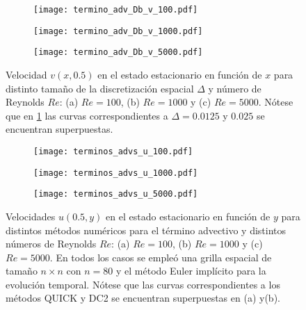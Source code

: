 \documentclass[aps,prb,twocolumn,superscriptaddress,floatfix,longbibliography,10pt]{revtex4-2}
\newcounter{para}
\begin{document}
\begin{figure}
  \centering
  
  \begin{subfigure}[b]{0.32\textwidth}
    \centering
    \texttt{[image: termino\_adv\_Db\_v\_100.pdf]}
    \caption{}
    \label{fig:termino_adv_Db_v_100}
\end{subfigure}
\hfill
\begin{subfigure}[b]{0.32\textwidth}
    \centering
    \texttt{[image: termino\_adv\_Db\_v\_1000.pdf]}
    \caption{}
    \label{fig:termino_adv_Db_v_1000}
\end{subfigure}
\hfill
\begin{subfigure}[b]{0.32\textwidth}
    \centering
    \texttt{[image: termino\_adv\_Db\_v\_5000.pdf]}
    \caption{}
    \label{fig:termino_adv_Db_v_5000}
\end{subfigure}
     \caption{Velocidad $v(x,0.5)$ en el estado estacionario en función de $x$ para distinto tamaño de la discretización espacial $\Delta$ y número de Reynolds $Re$: (a) $Re = 100$, (b) $Re = 1000$ y (c) $Re = 5000$. Nótese que en \ref{fig:termino_adv_Db_v_100} las curvas correspondientes a $\Delta = 0.0125$ y $0.025$ se encuentran superpuestas.}
     \label{fig:velocidades_v_DC2_vs_Re}
\end{figure}






\begin{figure}
  \centering
  \begin{subfigure}[b]{0.32\textwidth}
      \centering
      \texttt{[image: terminos\_advs\_u\_100.pdf]}
      \caption{}
      \label{fig:terminos_advs_u_100}
  \end{subfigure}
  \hfill
  \begin{subfigure}[b]{0.32\textwidth}
      \centering
      \texttt{[image: terminos\_advs\_u\_1000.pdf]}
      \caption{}
      \label{fig:terminos_advs_u_1000}
  \end{subfigure}
  \hfill
  \begin{subfigure}[b]{0.32\textwidth}
      \centering
      \texttt{[image: terminos\_advs\_u\_5000.pdf]}
      \caption{}
      \label{fig:terminos_advs_u_5000}
  \end{subfigure}
     \caption{Velocidades $u(0.5,y)$ en el estado estacionario en función de $y$ para distintos métodos numéricos para el término advectivo y distintos números de Reynolds $Re$: (a) $Re = 100$, (b) $Re = 1000$ y (c) $Re = 5000$. En todos los casos se empleó una grilla espacial de tamaño $n \times n$ con $n = 80$ y el método Euler implícito para la evolución temporal. Nótese que las curvas correspondientes a los métodos QUICK y DC2 se encuentran superpuestas en (a) y(b).}
     \label{fig:terminos_advs_u}
\end{figure}
\end{document}
